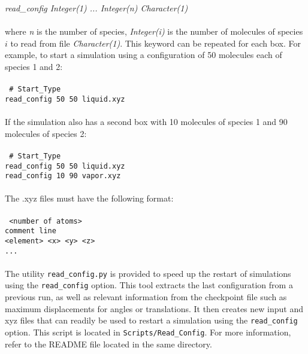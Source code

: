 \begin{itemize}
{\it read\_config Integer(1) ... Integer(n) Character(1)}\\ \\
%
where {\it n} is the number of species, {\it Integer(i)} is the number of molecules 
of species $i$ to read from file {\it Character(1)}.
This keyword can be repeated for each box. 
For example, to start a simulation using a configuration of 50 molecules each of species 1 and 2: \\ \\
%
\texttt{
\# Start\_Type \\
read\_config 50 50 liquid.xyz \\} \\
%
If the simulation also has a second box with 10 molecules of species 1 and 90 molecules of species 2: \\ \\ 
%
\texttt{
\# Start\_Type \\
read\_config 50 50 liquid.xyz \\
read\_config 10 90 vapor.xyz \\} \\
%
The .xyz files must have the following format:\\ \\
%
\texttt{
 <number of atoms>\\
 comment line\\
 <element> <x> <y> <z>\\
 ...\\
} \\
%
The utility \texttt{read\_config.py} is provided to speed up the restart of simulations using the {\tt read\_config} option.
This tool extracts the last configuration from a previous run, as well as relevant information from the checkpoint file 
such as maximum displacements for angles or translations. It then creates new input and xyz files that can readily be
used to restart a simulation using the {\tt read\_config} option. This script is located in \texttt{Scripts/Read\_Config}. 
For more information, refer to the README file located in the same directory.


\end{itemize}
